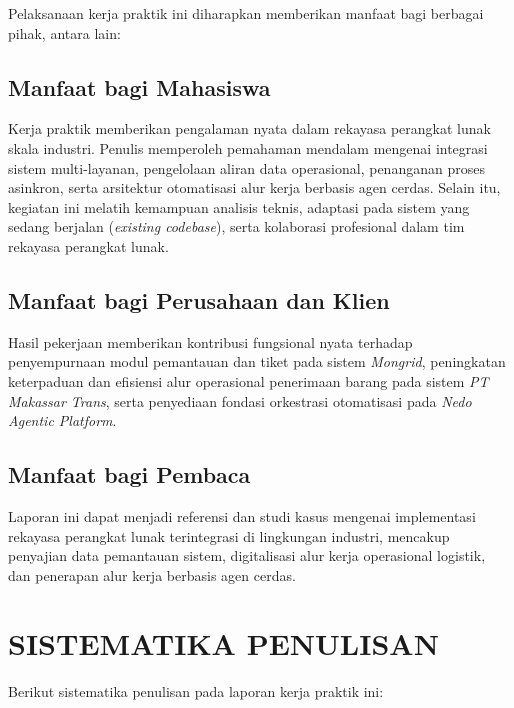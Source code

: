 Pelaksanaan kerja praktik ini diharapkan memberikan manfaat bagi berbagai pihak, antara lain:

\subsection{Manfaat bagi Mahasiswa}

Kerja praktik memberikan pengalaman nyata dalam rekayasa perangkat lunak skala industri. Penulis memperoleh pemahaman mendalam mengenai integrasi sistem multi-layanan, pengelolaan aliran data operasional, penanganan proses asinkron, serta arsitektur otomatisasi alur kerja berbasis agen cerdas. Selain itu, kegiatan ini melatih kemampuan analisis teknis, adaptasi pada sistem yang sedang berjalan (\textit{existing codebase}), serta kolaborasi profesional dalam tim rekayasa perangkat lunak.

\subsection{Manfaat bagi Perusahaan dan Klien}

Hasil pekerjaan memberikan kontribusi fungsional nyata terhadap penyempurnaan modul pemantauan dan tiket pada sistem \textit{Mongrid}, peningkatan keterpaduan dan efisiensi alur operasional penerimaan barang pada sistem \textit{PT Makassar Trans}, serta penyediaan fondasi orkestrasi otomatisasi pada \textit{Nedo Agentic Platform}.

\subsection{Manfaat bagi Pembaca}

Laporan ini dapat menjadi referensi dan studi kasus mengenai implementasi rekayasa perangkat lunak terintegrasi di lingkungan industri, mencakup penyajian data pemantauan sistem, digitalisasi alur kerja operasional logistik, dan penerapan alur kerja berbasis agen cerdas.

\section{SISTEMATIKA PENULISAN}

Berikut sistematika penulisan pada laporan kerja praktik ini:


